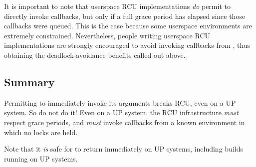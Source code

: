 It is important to note that userspace RCU implementations \emph{do}
permit  to directly invoke callbacks, but only if a full
grace period has elapsed since those callbacks were queued.
This is
the case because some userspace environments are extremely constrained.
Nevertheless, people writing userspace RCU implementations are strongly
encouraged to avoid invoking callbacks from , thus obtaining
the deadlock-avoidance benefits called out above.

\subsection{Summary}

Permitting  to immediately invoke its arguments breaks RCU,
even on a UP system.
So do not do it!
Even on a UP system, the RCU
infrastructure \emph{must} respect grace periods, and \emph{must} invoke callbacks
from a known environment in which no locks are held.

Note that it \emph{is} safe for  to return immediately on
UP systems, including  builds running on UP systems.

\QuickQuizEnd
